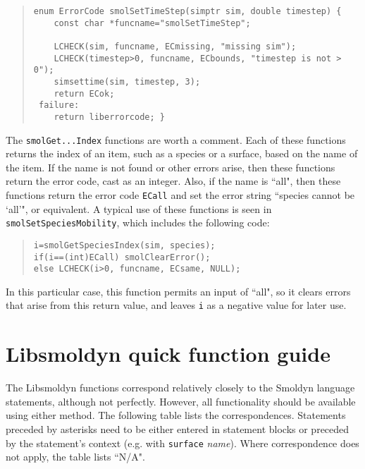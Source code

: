 \documentclass {book}
\begin{document}
\begin{quote}
\begin{lstlisting}
enum ErrorCode smolSetTimeStep(simptr sim, double timestep) {
	const char *funcname="smolSetTimeStep";

	LCHECK(sim, funcname, ECmissing, "missing sim");
	LCHECK(timestep>0, funcname, ECbounds, "timestep is not > 0");
	simsettime(sim, timestep, 3);
	return ECok;
 failure:
	return liberrorcode; }
\end{lstlisting}
\end{quote}

The \texttt{smolGet...Index} functions are worth a comment. Each of these functions returns the index of an item, such as a species or a surface, based on the name of the item. If the name is not found or other errors arise, then these functions return the error code, cast as an integer. Also, if the name is ``all", then these functions return the error code \texttt{ECall} and set the error string ``species cannot be `all'", or equivalent. A typical use of these functions is seen in \texttt{smolSetSpeciesMobility}, which includes the following code:

\begin{quote}
\begin{lstlisting}
i=smolGetSpeciesIndex(sim, species);
if(i==(int)ECall) smolClearError();
else LCHECK(i>0, funcname, ECsame, NULL);
\end{lstlisting}
\end{quote}

In this particular case, this function permits an input of ``all", so it clears errors that arise from this return value, and leaves \texttt{i} as a negative value for later use.


\chapter{Libsmoldyn quick function guide}
The Libsmoldyn functions correspond relatively closely to the Smoldyn language statements, although not perfectly. However, all functionality should be available using either method. The following table lists the correspondences. Statements preceded by asterisks need to be either entered in statement blocks or preceded by the statement's context (e.g. with \texttt{surface} \emph{name}). Where correspondence does not apply, the table lists ``N/A".
\end{document}
